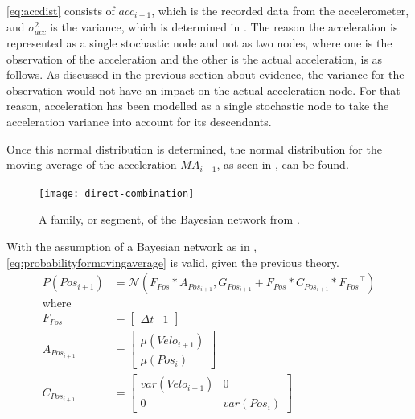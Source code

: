 \eqref{eq:accdist} consists of $acc_{i+1}$, which is the recorded data from the accelerometer, and $\sigma^2_{acc}$ is the variance, which is determined in . 
The reason the acceleration is represented as a single stochastic node and not as two nodes, where one is the observation of the acceleration and the other is the actual acceleration, is as follows.
As discussed in the previous section about evidence, the variance for the observation would not have an impact on the actual acceleration node. 
For that reason, acceleration has been modelled as a single stochastic node to take the acceleration variance into account for its descendants.

Once this normal distribution is determined, the normal distribution for the moving average of the acceleration $MA_{i+1}$, as seen in , can be found.

\begin{figure}[H]
\centering
\texttt{[image: direct-combination]}
\caption{A family, or segment, of the Bayesian network from .}
\label{fig:direct-combination}
\end{figure}

With the assumption of a Bayesian network as in , \eqref{eq:probabilityformovingaverage} is valid, given the previous theory.
\begin{equation}\label{eq:probabilityformovingaverage}
\begin{aligned}
P(Pos_{i+1})&=\mathcal{N}(F_{Pos}*A_{Pos_{i+1}},G_{Pos_{i+1}}+F_{Pos}*C_{Pos_{i+1}}*{F_{Pos}}^\intercal)\\
\text{where}&\\
F_{Pos}&=\begin{bmatrix} \Delta t & 1\end{bmatrix}\\
A_{Pos_{i+1}}&=\begin{bmatrix} \mu(Velo_{i+1}) \\ \mu(Pos_i)\end{bmatrix}\\	
C_{Pos_{i+1}}&=\begin{bmatrix} var(Velo_{i+1}) & 0 \\ 0 & var(Pos_{i}) \end{bmatrix}\\
\end{aligned}
\end{equation}

